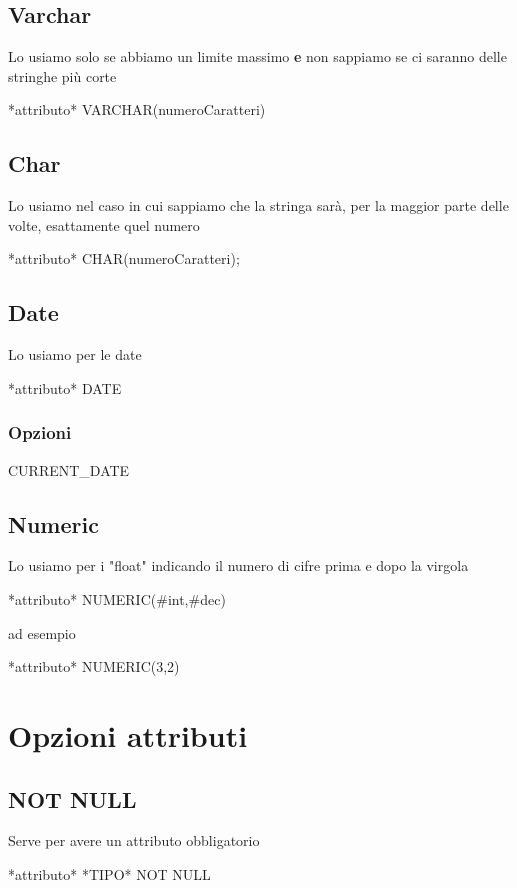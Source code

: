 \documentclass[12pt]{report}
\begin{document}
\section{Varchar}
Lo usiamo solo se abbiamo un limite massimo \textbf{e} non sappiamo se ci saranno delle stringhe più corte
\begin{spverbatim}
    *attributo* VARCHAR(numeroCaratteri)
\end{spverbatim}
\section{Char}
Lo usiamo nel caso in cui sappiamo che la stringa sarà, per la maggior parte delle volte, esattamente quel numero
\begin{spverbatim}
    *attributo* CHAR(numeroCaratteri);
\end{spverbatim}
\section{Date}
Lo usiamo per le date
\begin{spverbatim}
    *attributo* DATE
\end{spverbatim}
\subsection{Opzioni}
\begin{spverbatim}
    CURRENT_DATE %
\end{spverbatim}
\section{Numeric}
Lo usiamo per i "float" indicando il numero di cifre prima e dopo la virgola
\begin{spverbatim}
    *attributo* NUMERIC(#int,#dec)
\end{spverbatim}
ad esempio
\begin{spverbatim}
    *attributo* NUMERIC(3,2) %
\end{spverbatim}
\chapter{Opzioni attributi}
\section{NOT NULL}
Serve per avere un attributo obbligatorio
\begin{spverbatim}
    *attributo* *TIPO* NOT NULL
\end{spverbatim}
\end{document}

